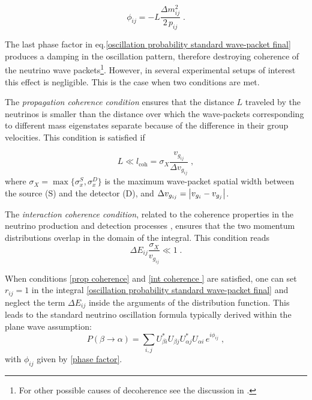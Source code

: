\documentclass[11pt]{article}
\begin{document}
\begin{equation}\label{phase factor}
     \phi_{ij} = - L\frac{\Delta m^2_{ij}}{2\,p_{ij}}\;.
\end{equation}


The last phase factor in eq.\eqref{oscillation probability standard wave-packet final} produces a damping in the oscillation pattern, therefore destroying coherence of the neutrino wave packets\footnote{For other possible causes of decoherence see the discussion in \cite{Ohlsson:2000mj}.}. However, in several experimental setups of interest this effect is negligible. This is the case when two conditions are met. 

The \emph{propagation coherence condition} ensures that the distance $L$ traveled by the neutrinos is smaller than the distance over which the wave-packets corresponding to different mass eigenstates separate because of the difference in their group velocities. This condition is satisfied if

\begin{equation}
    L \ll l_{\text{coh}} = \sigma_X\frac{v_{g_{ij}}}{\Delta v_{g_{ij}}}\;, \label{prop coherence}
\end{equation}
where $\sigma_X=\max \Big\{\sigma_{x}^S,\sigma_{x}^D\Big\}$ is the maximum wave-packet spatial width between the source (S) and the detector (D), and $\Delta v_{g_{ij}} = \abs{v_{g_i}-v_{g_j}}$.

The \emph{interaction coherence condition}, related to the coherence properties in the neutrino
production and detection processes \cite{Akhmedov:2009rb}, ensures that the two momentum distributions overlap in the domain of the integral. This condition reads
\begin{equation}\label{int coherence }
    \Delta E_{ij}\frac{\sigma_X}{v_{g_{ij}}} \ll 1\;.
\end{equation}


When conditions \eqref{prop coherence} and \eqref{int coherence } are satisfied, one can set $r_{ij}=1$ in the integral \eqref{oscillation probability standard wave-packet final} and neglect the term $\Delta E_{ij}$ inside the arguments of the distribution function. This leads to the standard neutrino oscillation formula typically derived within the plane wave assumption:
\begin{equation}\label{eq:oscillation standard}
     P(\beta\to\alpha) = \sum_{i,j} U^*_{\beta i} U_{\beta j} U^*_{\alpha j} U_{\alpha i}\,e^{i\phi_{ij}}\;,
\end{equation}
with $\phi_{ij}$ given by \eqref{phase factor}.
\end{document}
